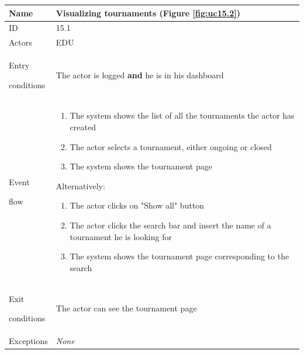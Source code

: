 \begin{center}
    \def\arraystretch{1.5}
    \begin{tabular}{| m{2cm} | m{10cm}|}
        \hline
        Name                  & Visualizing tournaments (Figure \ref{fig:uc15.2})                           \\ \hline
        ID                    & 15.1                                                                        \\ \hline
        Actors                & EDU                                                                         \\ \hline
        Entry \par conditions & The actor is logged \textbf{and} he is in his dashboard                     \\ \hline
        Event \par flow       & \begin{enumerate}
                                    \item The system shows the list of all the tournaments the actor has created
                                    \item The actor selects a tournament, either ongoing or closed
                                    \item The system shows the tournament page
                                \end{enumerate}
        Alternatively:
        \begin{enumerate}
            \item The actor clicks on "Show all" button
            \item The actor clicks the search bar and insert the name of a tournament he is looking for
            \item The system shows the tournament page corresponding to the search
        \end{enumerate}          \\ \hline
        Exit \par conditions  & The actor can see the tournament page                                       \\ \hline
        Exceptions            & \textit{None}                                                               \\ \hline
    \end{tabular}
\end{center}


